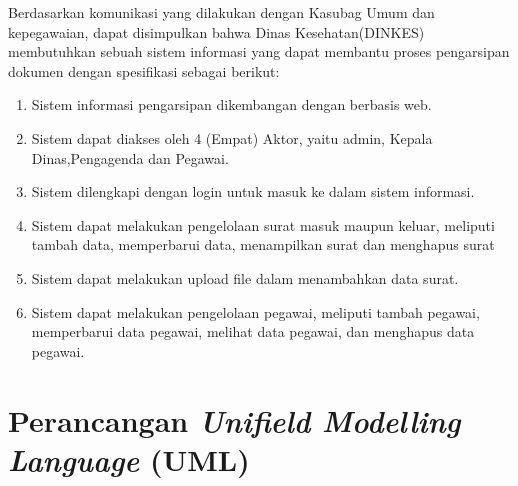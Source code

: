 Berdasarkan komunikasi yang dilakukan dengan Kasubag Umum dan kepegawaian, dapat disimpulkan bahwa Dinas Kesehatan(DINKES) membutuhkan sebuah sistem informasi yang dapat membantu proses pengarsipan dokumen dengan spesifikasi sebagai berikut:
\begin{enumerate}
	\item Sistem informasi pengarsipan dikembangan dengan berbasis web.
	\item Sistem dapat diakses oleh 4 (Empat) Aktor, yaitu admin, Kepala Dinas,Pengagenda dan Pegawai.
	\item Sistem dilengkapi dengan login untuk masuk ke dalam sistem informasi.
	\item Sistem dapat melakukan pengelolaan surat masuk maupun keluar, meliputi tambah data, memperbarui data, menampilkan surat dan menghapus surat
	\item Sistem dapat melakukan upload file dalam  menambahkan data surat.
	\item Sistem dapat melakukan pengelolaan pegawai, meliputi tambah pegawai, memperbarui data pegawai, melihat data pegawai, dan menghapus data pegawai.
\end{enumerate}

\section{Perancangan \textit{Unifield Modelling Language} (UML)}
